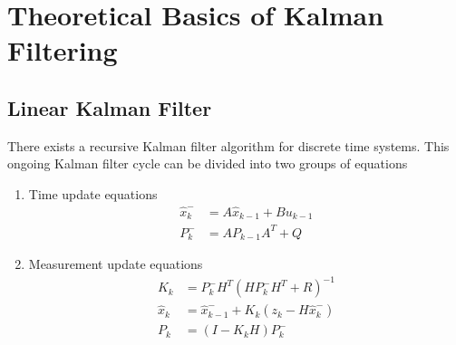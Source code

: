 \chapter{Theoretical Basics of Kalman Filtering}

\section{Linear Kalman Filter}
\label{sec:LinKF}
There exists a recursive Kalman filter algorithm for discrete time systems.\cite{IntroKF} This ongoing Kalman filter cycle can be divided into two groups of equations
\newline
\begin{enumerate}
	\item Time update equations
	\begin{eqnarray}\label{eq:TupEq}
    			\hat{x}_{k}^{-} &= A\hat{x}_{k-1}+Bu_{k-1} \\
    			P_{k}^{-} &= AP_{k-1}A^{T}+Q \nonumber
	\end{eqnarray}
	\item Measurement update equations
	\begin{eqnarray}\label{eq:MupEq}
    			K_{k} &= P_{k}^{-}H^{T}(HP_{k}^{-}H^{T}+R)^{-1} \nonumber\\
    			\hat{x}_{k} &= \hat{x}_{k-1}^{-}+K_{k}(z_{k}-H\hat{x}_{k}^{-}) \\
			P_{k} &= (I-K_{k}H)P_{k}^{-} \nonumber
	\end{eqnarray}
\end{enumerate}


